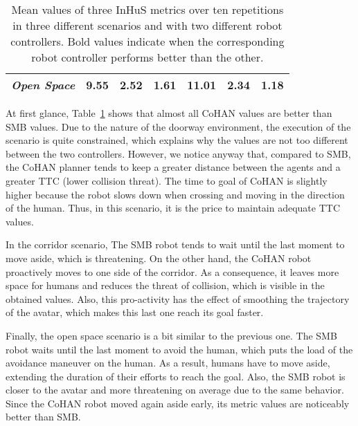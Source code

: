 \begin{table}[]
\begin{tabular}{c|ccc|ccc|}
    \multicolumn{1}{|c|}{\textit{Open Space}} & \multicolumn{1}{c|}{\textbf{9.55}}                                              & \multicolumn{1}{c|}{\textbf{2.52}}                                                    & \textbf{1.61}                                                  & \multicolumn{1}{c|}{11.01}                                                      & \multicolumn{1}{c|}{2.34}                                                             & 1.18                                                           \\ \hline
    \end{tabular}
    \caption{Mean values of three InHuS metrics over ten repetitions in three different scenarios and with two different robot controllers. Bold values indicate when the corresponding robot controller performs better than the other.}
    \label{tab:compare_robots}
\end{table}

At first glance, Table~\ref{tab:compare_robots} shows that almost all CoHAN values are better than SMB values. Due to the nature of the doorway environment, the execution of the scenario is quite constrained, which explains why the values are not too different between the two controllers. However, we notice anyway that, compared to SMB, the CoHAN planner tends to keep a greater distance between the agents and a greater TTC (lower collision threat). The time to goal of CoHAN is slightly higher because the robot slows down when crossing and moving in the direction of the human. Thus, in this scenario, it is the price to maintain adequate TTC values.

In the corridor scenario, The SMB robot tends to wait until the last moment to move aside, which is threatening. On the other hand, the CoHAN robot proactively moves to one side of the corridor. As a consequence, it leaves more space for humans and reduces the threat of collision, which is visible in the obtained values. Also, this pro-activity has the effect of smoothing the trajectory of the avatar, which makes this last one reach its goal faster.

Finally, the open space scenario is a bit similar to the previous one. The SMB robot waits until the last moment to avoid the human, which puts the load of the avoidance maneuver on the human. As a result, 
humans have to move aside, extending the duration of their efforts to reach the goal. Also, the SMB robot is closer to the avatar and more threatening on average due to the same behavior. Since the CoHAN robot moved again aside early, its metric values are noticeably better than SMB.

